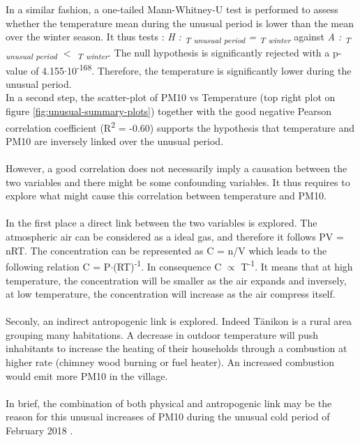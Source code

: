 \documentclass[a4paper, 12pt]{article}
\begin{document}
    \\
    \\
    In a similar fashion, a one-tailed Mann-Whitney-U test is performed to assess whether the temperature mean during the unusual period is lower than the mean over the winter season. It thus tests : \textit{H : \textmu \textsubscript{T unusual period} = \textmu \textsubscript{T winter}} against \textit{A : \textmu \textsubscript{T unusual period} $<$ \textmu \textsubscript{T winter}}. The null hypothesis is significantly rejected with a p-value of 4.155$\cdot$10\textsuperscript{-168}. Therefore, the temperature is significantly lower during the unusual period. 
    \\
    In a second step, the scatter-plot of PM10 vs Temperature (top right plot on figure \ref{fig:unusual-summary-plots}) together with the good negative Pearson correlation coefficient (R\textsuperscript{2} = -0.60) supports the hypothesis that temperature and PM10 are inversely linked over the unusual period. 
    \\
    \\
    However, a good correlation does not necessarily imply a causation between the two variables and there might be some confounding variables. It thus requires to explore what might cause this correlation between temperature and PM10. 
    \\
    \\
    In the first place a direct link between the two variables is explored. The atmospheric air can be considered as a ideal gas, and therefore it follows PV = nRT. The concentration can be represented as C = n/V which leads to the following relation C = P$\cdot$(RT)\textsuperscript{-1}. In consequence C $\propto$ T\textsuperscript{-1}. It means that at high temperature, the concentration will be smaller as the air expands and inversely, at low temperature, the concentration will increase as the air compress itself.
    \\
    \\
    Seconly, an indirect antropogenic link is explored. Indeed Tänikon is a rural area grouping many habitations. A decrease in outdoor temperature will push inhabitants to increase the heating of their households through a combustion at higher rate (chimney wood burning or fuel heater). An increased combustion would emit more PM10 in the village.  
    \\
    \\
    In brief, the combination of both physical and antropogenic link may be the reason for this unusual increases of PM10 during the unusual cold period of February 2018 \cite{meteoSuisse_Feb2018}. 
\end{document}
